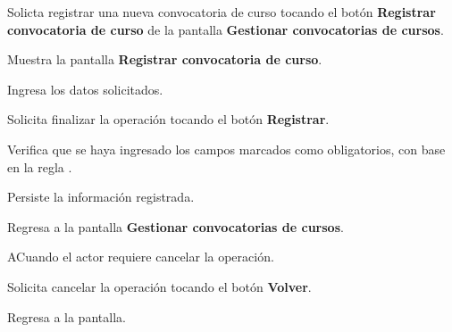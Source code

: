 	\begin{UCtrayectoria}
		
		\UCpaso [\UCactor] Solicta registrar una nueva convocatoria de curso tocando el botón \textbf{Registrar convocatoria de curso} de la pantalla \textbf{Gestionar convocatorias de cursos}.
		
		\UCpaso Muestra la pantalla \textbf{Registrar convocatoria de curso}.
		
		\UCpaso [\UCactor] Ingresa los datos solicitados.
		
		\UCpaso [\UCactor] Solicita finalizar la operación tocando el botón \textbf{Registrar}. 
		
		\UCpaso Verifica que se haya ingresado los campos marcados como obligatorios, con base en la regla .
		
		\UCpaso Persiste la información registrada.
		
		\UCpaso Regresa a la pantalla \textbf{Gestionar convocatorias de cursos}.
		
	\end{UCtrayectoria}

	\begin{UCtrayectoriaA}{A}{Cuando el actor requiere cancelar la operación.}
		
		\UCpaso [\UCactor] Solicita cancelar la operación tocando el botón \textbf{Volver}.
		
		\UCpaso Regresa a la pantalla.
		
	\end{UCtrayectoriaA}